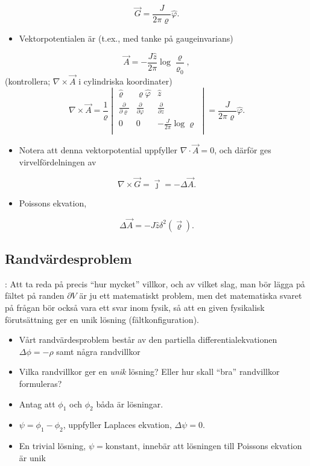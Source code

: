 \documentclass[%
oneside,                 %
final,                   %
10pt]{article}
\newcommand{\longinlinecomment}[3]{{\color{red}{\bf #1}: #2}}
\begin{document}
\noindent
$$
\vec G=\frac{J}{2\pi\varrho}\hat\varphi.
$$
\begin{itemize}
\item Vektorpotentialen är (t.ex., med tanke på gaugeinvarians)
\end{itemize}

\noindent
$$
\vec A=-\frac{J\hat z}{2\pi}\log\frac{\varrho}{\varrho_0},
$$
(kontrollera; $\nabla\times\vec A$ i cylindriska koordinater)
$$
\nabla\times\vec A=\frac{1}{\varrho}
	\begin{vmatrix}
        \hat\varrho & \varrho\hat\varphi & \hat z \\ \frac{\partial}{\partial \varrho} & 
\frac{\partial}{\partial \varphi} &
        \frac{\partial}{\partial z} \\ 0\mbox{} & 0\mbox{} & -\frac{J}{2\pi}\log\varrho \\
        \end{vmatrix}
           =\frac{J}{2\pi\varrho}\hat\varphi.
$$
\begin{itemize}
\item Notera att denna vektorpotential uppfyller $\nabla\cdot\vec A=0$, och därför ges virvelfördelningen av 
\end{itemize}

\noindent
$$
\nabla \times \vec{G} = \vec{\jmath} = -\Delta\vec A.
$$ 
\begin{itemize}
\item Poissons ekvation, 
\end{itemize}

\noindent
$$
\Delta\vec A=-J\hat z\delta^2(\vec{\varrho}).
$$


\subsection{Randvärdesproblem}

\longinlinecomment{Comment 7}{ Att ta reda på precis ``hur mycket'' villkor, och av vilket slag, man bör lägga på fältet på randen $\partial V$ är ju ett matematiskt problem, men det matematiska svaret på frågan bör också vara ett svar inom fysik, så att en given fysikalisk förutsättning ger en unik lösning (fältkonfiguration). }{ Att ta reda på }

\begin{itemize}
\item Vårt randvärdesproblem består av den partiella differentialekvationen $\Delta\phi=-\rho$ samt några randvillkor 

\item Vilka randvillkor ger en \emph{unik} lösning? Eller hur skall ``bra'' randvillkor formuleras? 

\item Antag att $\phi_1$ och $\phi_2$ båda är lösningar. 

\item $\psi=\phi_1-\phi_2$, uppfyller Laplaces ekvation, $\Delta\psi=0$. 

\item En trivial lösning, $\psi=\mathrm{konstant}$, innebär att lösningen till Poissons ekvation är unik 
\end{itemize}
\end{document}
